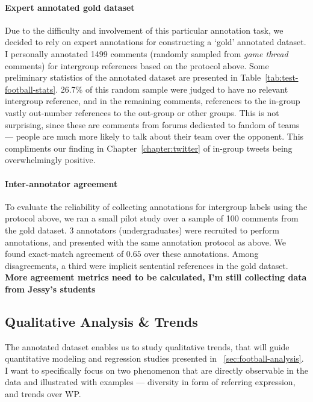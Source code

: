 \paragraph{Expert annotated gold dataset} Due to the difficulty and involvement of this particular annotation task, we decided to rely on expert annotations for constructing a `gold' annotated dataset. I personally annotated 1499 comments (randomly sampled from \emph{game thread} comments) for intergroup references based on the protocol above. Some preliminary statistics of the annotated dataset are presented in Table~\ref{tab:test-football-stats}. 26.7\% of this random sample were judged to have no relevant intergroup reference, and in the remaining comments, references to the in-group vastly out-number references to the out-group or other groups. This is not surprising, since these are comments from forums dedicated to fandom of teams --- people are much more likely to talk about their team over the opponent. This compliments our finding in Chapter~\ref{chapter:twitter} of in-group tweets being overwhelmingly positive.



\paragraph{Inter-annotator agreement} To evaluate the reliability of collecting annotations for intergroup labels using the protocol above, we ran a small pilot study over a sample of 100 comments from the gold dataset. 3 annotators (undergraduates) were recruited to perform annotations, and presented with the same annotation protocol as above. We found exact-match agreement of $0.65$ over these annotations. Among disagreements, a third were implicit sentential references in the gold dataset. \textbf{More agreement metrics need to be calculated, I'm still collecting data from Jessy's students}


\subsection{Qualitative Analysis \& Trends}
\label{subsec:football-trends}

The annotated dataset enables us to study qualitative trends, that will guide quantitative modeling and regression studies presented in \textsection~\ref{sec:football-analysis}. I want to specifically focus on two phenomenon that are directly observable in the data and illustrated with examples --- diversity in form of referring expression, and trends over WP.

